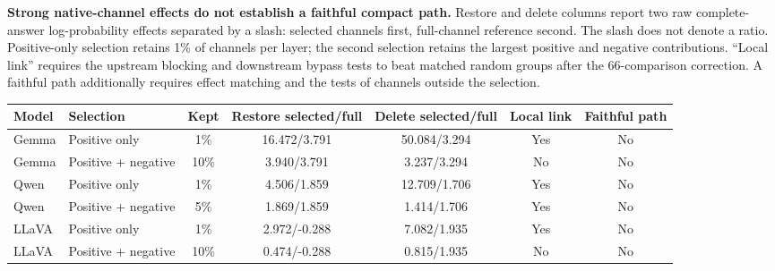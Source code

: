 \begin{samepage}
\begin{center}
\begin{minipage}{\linewidth}
\captionsetup{type=table,hypcap=false}
\caption{\textbf{Strong native-channel effects do not establish a faithful compact path.} Restore and delete columns report two raw complete-answer log-probability effects separated by a slash: selected channels first, full-channel reference second. The slash does not denote a ratio. Positive-only selection retains 1\% of channels per layer; the second selection retains the largest positive and negative contributions. ``Local link'' requires the upstream blocking and downstream bypass tests to beat matched random groups after the 66-comparison correction. A faithful path additionally requires effect matching and the tests of channels outside the selection.}
\label{tab:native-channel-path}
\centering
\small
\setlength{\tabcolsep}{1.8pt}
\begin{tabular*}{\linewidth}{@{\extracolsep{\fill}}llccccc@{}}
\toprule
Model & Selection & Kept & Restore selected/full & Delete selected/full & Local link & Faithful path \\
\midrule
Gemma & Positive only & 1\% & 16.472/3.791 & 50.084/3.294 & Yes & No \\
Gemma & Positive + negative & 10\% & 3.940/3.791 & 3.237/3.294 & No & No \\
Qwen & Positive only & 1\% & 4.506/1.859 & 12.709/1.706 & Yes & No \\
Qwen & Positive + negative & 5\% & 1.869/1.859 & 1.414/1.706 & Yes & No \\
LLaVA & Positive only & 1\% & 2.972/-0.288 & 7.082/1.935 & Yes & No \\
LLaVA & Positive + negative & 10\% & 0.474/-0.288 & 0.815/1.935 & No & No \\
\bottomrule
\end{tabular*}
\end{minipage}
\end{center}
\end{samepage}

